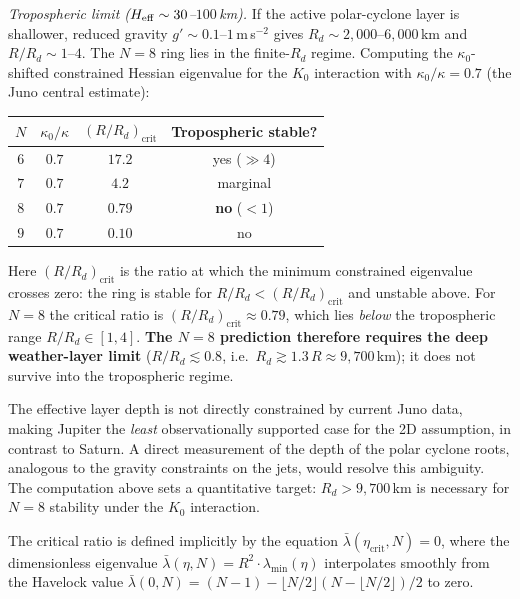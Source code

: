 \textit{Tropospheric limit ($H_{\rm eff} \sim 30$--$100$\,km).}
If the active polar-cyclone layer is shallower, reduced gravity
$g' \sim 0.1$--$1$\,m\,s$^{-2}$ gives
$R_d \sim 2{,}000$--$6{,}000$\,km and $R/R_d \sim 1$--$4$.
The $N = 8$ ring lies in the finite-$R_d$ regime.  Computing the
$\kappa_0$-shifted constrained Hessian eigenvalue for the $K_0$
interaction with $\kappa_0/\kappa = 0.7$ (the Juno central estimate):
\begin{center}
\begin{tabular}{cccc}
\toprule
$N$ & $\kappa_0/\kappa$ & $(R/R_d)_{\mathrm{crit}}$ & Tropospheric stable? \\
\midrule
$6$ & $0.7$ & $17.2$ & yes ($\gg 4$) \\
$7$ & $0.7$ & $4.2$  & marginal \\
$8$ & $0.7$ & $\mathbf{0.79}$ & \textbf{no} ($< 1$) \\
$9$ & $0.7$ & $0.10$ & no \\
\bottomrule
\end{tabular}
\end{center}
Here $(R/R_d)_{\mathrm{crit}}$ is the ratio at which the minimum
constrained eigenvalue crosses zero: the ring is stable for
$R/R_d < (R/R_d)_{\mathrm{crit}}$ and unstable above.  For $N = 8$
the critical ratio is $(R/R_d)_{\mathrm{crit}} \approx 0.79$, which
lies \emph{below} the tropospheric range $R/R_d \in [1, 4]$.
\textbf{The $N = 8$ prediction therefore requires the deep
weather-layer limit} ($R/R_d \lesssim 0.8$, i.e.\
$R_d \gtrsim 1.3\,R \approx 9{,}700$\,km); it does not survive
into the tropospheric regime.

The effective layer depth is not directly constrained by current Juno
data, making Jupiter the \emph{least} observationally supported case
for the 2D assumption, in contrast to Saturn.  A direct measurement
of the depth of the polar cyclone roots, analogous to the gravity
constraints on the jets, would resolve this ambiguity.  The
computation above sets a quantitative target: $R_d > 9{,}700$\,km
is necessary for $N = 8$ stability under the $K_0$ interaction.

The critical ratio is defined implicitly by the equation
$\bar\lambda(\eta_{\mathrm{crit}}, N) = 0$, where the dimensionless
eigenvalue $\bar\lambda(\eta, N) = R^2 \cdot \lambda_{\min}(\eta)$
interpolates smoothly from the Havelock value
$\bar\lambda(0, N) = (N{-}1) - \lfloor N/2\rfloor
(N{-}\lfloor N/2\rfloor)/2$ to zero.

